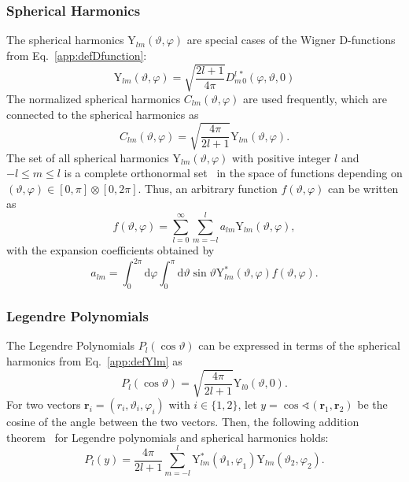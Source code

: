 \subsubsection*{Spherical Harmonics}
The spherical harmonics $\text{Y}_{lm}(\vartheta,\varphi)$ are special cases of the Wigner D-functions~\cite{varshalovich1988} from Eq.~\eqref{app:defDfunction}:
\begin{equation}
\label{app:defYlm}
\text{Y}_{lm}(\vartheta,\varphi)=\sqrt{\frac{2l+1}{4\pi}}
D^{l\,*}_{m\,0}(\varphi,\vartheta,0)
\end{equation}
The normalized spherical harmonics $C_{lm}(\vartheta,\varphi)$ are used frequently, which are connected to the spherical harmonics as
\begin{equation}
C_{lm}(\vartheta,\varphi) = \sqrt{\frac{4\pi}{2l+1}}\text{Y}_{lm}(\vartheta,\varphi).
\end{equation}
The set of all spherical harmonics $\text{Y}_{lm}(\vartheta,\varphi)$ with positive integer $l$ and $-l\leq m \leq l$ is a complete orthonormal set~\cite{varshalovich1988} in the space of functions depending on $(\vartheta,\varphi)\in [0,\pi]\otimes [0,2\pi]$. Thus, an arbitrary function $f(\vartheta,\varphi)$ can be written as
\begin{equation}
f(\vartheta,\varphi)=\sum_{l=0}^\infty \sum_{m=-l}^l a_{lm}\text{Y}_{lm}(\vartheta,\varphi),
\end{equation}
with the expansion coefficients obtained by
\begin{equation}
a_{lm}=\int_0^{2\pi}\text{d}\varphi\int_0^\pi\text{d}\vartheta \sin\vartheta \text{Y}^{*}_{lm}(\vartheta,\varphi)f(\vartheta,\varphi).
\end{equation}

\subsubsection*{Legendre Polynomials}
The Legendre Polynomials $P_l(\cos\vartheta)$ can be expressed in terms of the spherical harmonics from Eq.~\eqref{app:defYlm} as
\begin{equation}
P_l(\cos\vartheta)=\sqrt{\frac{4\pi}{2l+1}}\text{Y}_{l0}(\vartheta,0).
\end{equation}
For two vectors $\mathbf{r}_i=(r_i,\vartheta_i,\varphi_i)$ with $i\in\{1,2\}$, let $y=\cos\sphericalangle(\mathbf{r}_1,\mathbf{r}_2)$ be the cosine of the angle between the two vectors. Then, the following addition theorem~\cite{varshalovich1988} for Legendre polynomials and spherical harmonics holds:
\begin{equation}
\label{eq:legendreAddTheorem}
P_l(y) = \frac{4\pi}{2l+1}\sum_{m=-l}^l \text{Y}_{lm}^*(\vartheta_1,\varphi_1)\text{Y}_{lm}(\vartheta_2,\varphi_2).
\end{equation}
